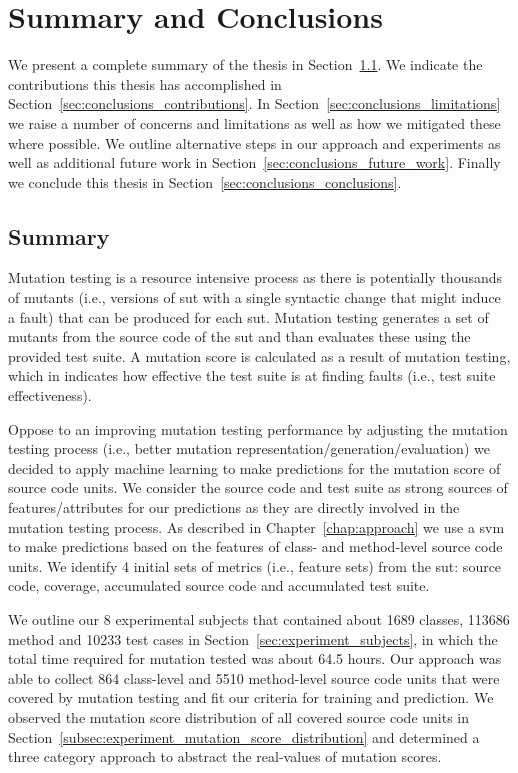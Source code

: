 \chapter{Summary and Conclusions}
\label{chap:conclusions}
We present a complete summary of the thesis in Section~\ref{sec:conclusions_summary}. We indicate the contributions this thesis has accomplished in Section~\ref{sec:conclusions_contributions}. In Section~\ref{sec:conclusions_limitations} we raise a number of concerns and limitations as well as how we mitigated these where possible. We outline alternative steps in our approach and experiments as well as additional future work in Section~\ref{sec:conclusions_future_work}. Finally we conclude this thesis in Section~\ref{sec:conclusions_conclusions}.


\section{Summary}
\label{sec:conclusions_summary}
Mutation testing is a resource intensive process as there is potentially thousands of mutants (i.e., versions of \gls{sut} with a single syntactic change that might induce a fault) that can be produced for each \gls{sut}. Mutation testing generates a set of mutants from the source code of the \gls{sut} and than evaluates these using the provided test suite. A mutation score is calculated as a result of mutation testing, which in indicates how effective the test suite is at finding faults (i.e., test suite effectiveness).

Oppose to an improving mutation testing performance by adjusting the mutation testing process (i.e., better mutation representation/generation/evaluation) we decided to apply machine learning to make predictions for the mutation score of source code units. We consider the source code and test suite as strong sources of features/attributes for our predictions as they are directly involved in the mutation testing process. As described in Chapter~\ref{chap:approach} we use a \gls{svm} to make predictions based on the features of class- and method-level source code units. We identify 4 initial sets of metrics (i.e., feature sets) from the \gls{sut}: source code, coverage, accumulated source code and accumulated test suite.

We outline our 8 experimental subjects that contained about 1689 classes, 113686 method and 10233 test cases in Section~\ref{sec:experiment_subjects}, in which the total time required for mutation tested was about 64.5 hours. Our approach was able to collect 864 class-level and 5510 method-level source code units that were covered by mutation testing and fit our criteria for training and prediction. We observed the mutation score distribution of all covered source code units in Section~\ref{subsec:experiment_mutation_score_distribution} and determined a three category approach to abstract the real-values of mutation scores.

